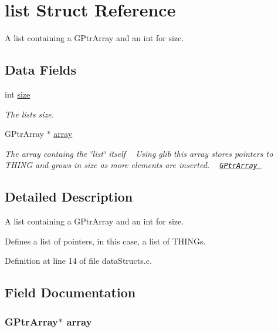 \hypertarget{structlist}{}\section{list Struct Reference}
\label{structlist}


A list containing a G\+Ptr\+Array and an int for size.  


\subsection*{Data Fields}
\begin{DoxyCompactItemize}
\item 
int \hyperlink{structlist_a439227feff9d7f55384e8780cfc2eb82}{size}
\begin{DoxyCompactList}\small\item\em The list\textquotesingle{}s size. \end{DoxyCompactList}\item 
G\+Ptr\+Array $\ast$ \hyperlink{structlist_a3167491f9e7a19c8575b456fb7830733}{array}
\begin{DoxyCompactList}\small\item\em The array containg the \char`\"{}list\char`\"{} itself  ~\newline
 Using glib this array stores pointers to T\+H\+I\+NG and grows in size as more elements are inserted. ~\newline
 \href{https://developer.gnome.org/glib/stable/glib-Pointer-Arrays.html}{\tt G\+Ptr\+Array  } \end{DoxyCompactList}\end{DoxyCompactItemize}


\subsection{Detailed Description}
A list containing a G\+Ptr\+Array and an int for size. 

Defines a list of pointers, in this case, a list of T\+H\+I\+N\+Gs. 

Definition at line 14 of file data\+Structs.\+c.



\subsection{Field Documentation}
\subsubsection[{\texorpdfstring{array}{array}}]{\setlength{\rightskip}{0pt plus 5cm}G\+Ptr\+Array$\ast$ array}\hypertarget{structlist_a3167491f9e7a19c8575b456fb7830733}{}\label{structlist_a3167491f9e7a19c8575b456fb7830733}


